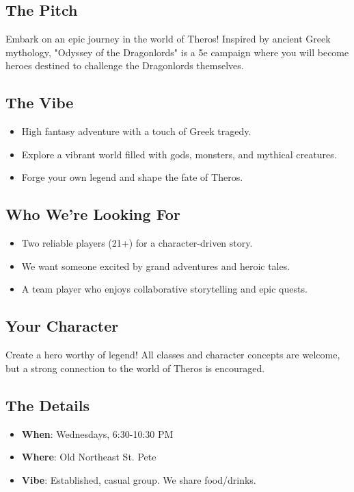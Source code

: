\documentclass[a4paper, 8pt]{extarticle}
\begin{document}
\color{DrowPurple}


\vspace{2cm}

\subsection*{\textbf{The Pitch}}
Embark on an epic journey in the world of Theros! Inspired by ancient Greek mythology, "Odyssey of the Dragonlords" is a 5e campaign where you will become heroes destined to challenge the Dragonlords themselves.

\subsection*{\textbf{The Vibe}}
\begin{itemize}
    \item High fantasy adventure with a touch of Greek tragedy.
    \item Explore a vibrant world filled with gods, monsters, and mythical creatures.
    \item Forge your own legend and shape the fate of Theros.
\end{itemize}

\subsection*{\textbf{Who We're Looking For}}
\begin{itemize}
    \item Two reliable players (21+) for a character-driven story.
    \item We want someone excited by grand adventures and heroic tales.
    \item A team player who enjoys collaborative storytelling and epic quests.
\end{itemize}

\subsection*{\textbf{Your Character}}
Create a hero worthy of legend! All classes and character concepts are welcome, but a strong connection to the world of Theros is encouraged.

\subsection*{\textbf{The Details}}
\begin{itemize}
    \item \textbf{When}: Wednesdays, 6:30-10:30 PM
    \item \textbf{Where}: Old Northeast St. Pete
    \item \textbf{Vibe}: Established, casual group. We share food/drinks.
\end{itemize}
\end{document}
